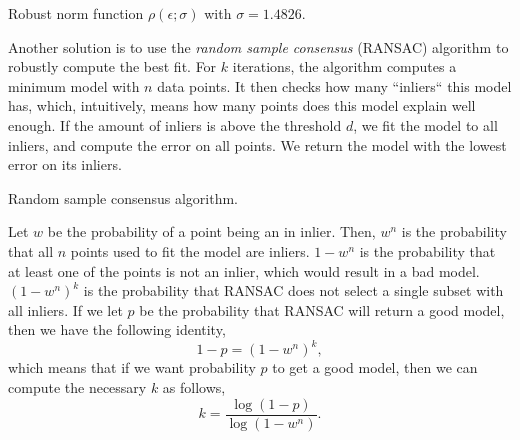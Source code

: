 \begin{marginfigure}

  \caption{Robust norm function $\rho(\epsilon;\sigma)$ with $\sigma=1.4826$.}
  \label{fig:robust-norm}
\end{marginfigure}

Another solution is to use the \textit{random sample consensus} (RANSAC)
algorithm to robustly compute the best fit. For $k$ iterations, the algorithm
computes a minimum model with $n$ data points. It then checks how many
``inliers`` this model has, which, intuitively, means how many points does this
model explain well enough. If the amount of inliers is above the threshold $d$,
we fit the model to all inliers, and compute the error on all points. We return
the model with the lowest error on its inliers.

\begin{algorithm}
  \begin{algorithmic}
      \State {$\epsilon_{\min} \gets \infty$}

         
          \EndIf
        \EndFor

          \If {$\epsilon < \epsilon_{\min}$}
          \EndIf
        \EndIf
      \End
    \EndFunction
  \end{algorithmic}
  \caption{Random sample consensus algorithm.}
\end{algorithm}

Let $w$ be the probability of a point being an in inlier. Then, $w^n$ is the
probability that all $n$ points used to fit the model are inliers. $1-w^n$ is
the probability that at least one of the points is not an inlier, which would
result in a bad model. $(1-w^n)^k$ is the probability that RANSAC does not
select a single subset with all inliers. If we let $p$ be the probability that
RANSAC will return a good model, then we have the following identity, \[
  1-p = (1-w^n)^k
,\]
which means that if we want probability $p$ to get a good model, then we can
compute the necessary $k$ as follows, \[
  k = \frac{\log(1-p)}{\log(1-w^n)}
.\]
